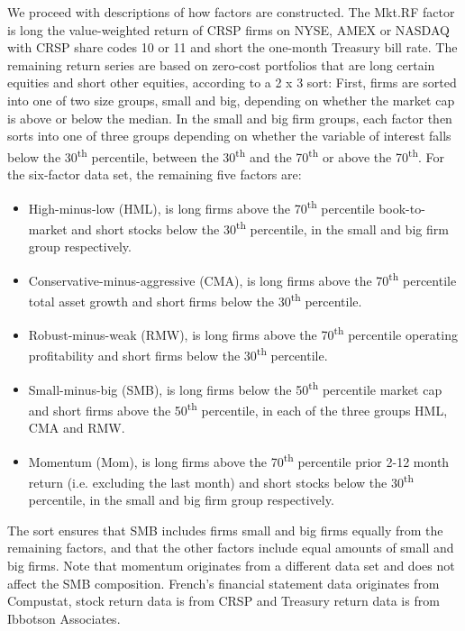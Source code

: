 We proceed with descriptions of how factors are constructed. The Mkt.RF factor is long the value-weighted return of CRSP firms on NYSE, AMEX or NASDAQ with CRSP share codes 10 or 11 and short the one-month Treasury bill rate. The remaining return series are based on zero-cost portfolios that are long certain equities and short other equities, according to a 2 x 3 sort: First, firms are sorted into one of two size groups, small and big, depending on whether the market cap is above or below the median. In the small and big firm groups, each factor then sorts into one of three groups depending on whether the variable of interest falls below the 30\textsuperscript{th} percentile, between the 30\textsuperscript{th} and the 70\textsuperscript{th} or above the 70\textsuperscript{th}. For the six-factor data set, the remaining five factors are:
\begin{itemize}
  \item High-minus-low (HML), is long firms above the 70\textsuperscript{th} percentile book-to-market and short stocks below the 30\textsuperscript{th} percentile, in the small and big firm group respectively.
  \item Conservative-minus-aggressive (CMA), is long firms above the 70\textsuperscript{th} percentile total asset growth and short firms below the 30\textsuperscript{th} percentile. 
  \item Robust-minus-weak (RMW), is long firms above the 70\textsuperscript{th} percentile operating profitability and short firms below the 30\textsuperscript{th} percentile. 
  \item Small-minus-big (SMB), is long firms below the 50\textsuperscript{th} percentile market cap and short firms above the 50\textsuperscript{th} percentile, in each of the three groups HML, CMA and RMW.
  \item Momentum (Mom), is long firms above the 70\textsuperscript{th} percentile prior 2-12 month return (i.e. excluding the last month) and short stocks below the 30\textsuperscript{th} percentile, in the small and big firm group respectively.
\end{itemize}
The sort ensures that SMB includes firms small and big firms equally from the remaining factors, and that the other factors include equal amounts of small and big firms. Note that momentum originates from a different data set and does not affect the SMB composition. French's financial statement data originates from Compustat, stock return data is from CRSP and Treasury return data is from Ibbotson Associates.

